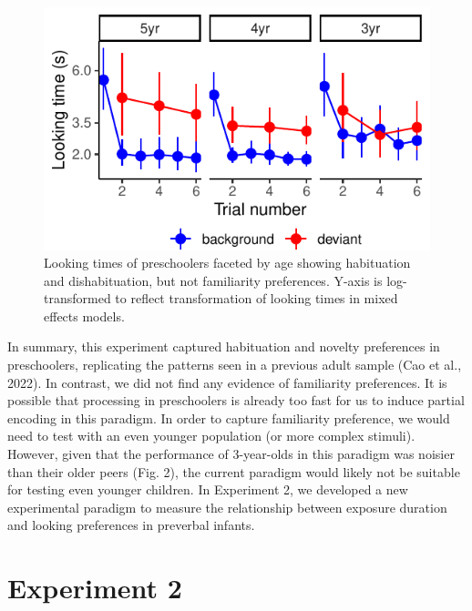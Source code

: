 \documentclass[10pt, letterpaper]{article}
\newenvironment{CodeChunk}{}{}
\begin{document}
\begin{CodeChunk}
\begin{figure}[t!]

\includegraphics{figs/unnamed-chunk-13-1} \hfill{}

\caption[Looking times of preschoolers faceted by age showing habituation and dishabituation, but not familiarity preferences]{Looking times of preschoolers faceted by age showing habituation and dishabituation, but not familiarity preferences. Y-axis is log-transformed to reflect transformation of looking times in mixed effects models.}\label{fig:unnamed-chunk-13}
\end{figure}
\end{CodeChunk}

In summary, this experiment captured habituation and novelty preferences
in preschoolers, replicating the patterns seen in a previous adult
sample (Cao et al., 2022). In contrast, we did not find any evidence of
familiarity preferences. It is possible that processing in preschoolers
is already too fast for us to induce partial encoding in this paradigm.
In order to capture familiarity preference, we would need to test with
an even younger population (or more complex stimuli). However, given
that the performance of 3-year-olds in this paradigm was noisier than
their older peers (Fig. 2), the current paradigm would likely not be
suitable for testing even younger children. In Experiment 2, we
developed a new experimental paradigm to measure the relationship
between exposure duration and looking preferences in preverbal infants.

\hypertarget{experiment-2}{%
\section{Experiment 2}\label{experiment-2}}
\end{document}
